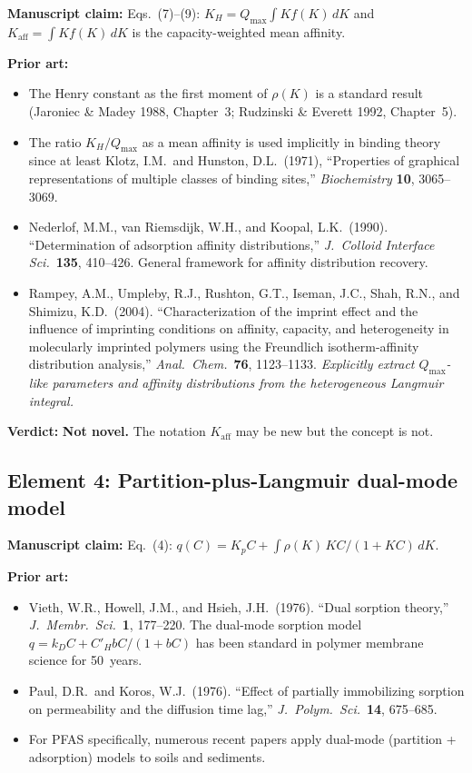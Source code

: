 \documentclass[12pt]{article}
\begin{document}
\textbf{Manuscript claim:} Eqs.~(7)--(9): $K_H=Q_{\max}\int K f(K)\,dK$
and $K_{\mathrm{aff}}=\int K f(K)\,dK$ is the capacity-weighted mean
affinity.

\textbf{Prior art:}
\begin{itemize}[nosep]
  \item The Henry constant as the first moment of $\rho(K)$ is a standard
        result (Jaroniec \& Madey 1988, Chapter~3; Rudzinski \& Everett
        1992, Chapter~5).
  \item The ratio $K_H/Q_{\max}$ as a mean affinity is used implicitly
        in binding theory since at least Klotz, I.M.\ and Hunston, D.L.\
        (1971), ``Properties of graphical representations of multiple
        classes of binding sites,'' \textit{Biochemistry} \textbf{10},
        3065--3069.
  \item Nederlof, M.M., van Riemsdijk, W.H., and Koopal, L.K.\ (1990).
        ``Determination of adsorption affinity distributions,''
        \textit{J.\ Colloid Interface Sci.}\ \textbf{135}, 410--426.
        General framework for affinity distribution recovery.
  \item Rampey, A.M., Umpleby, R.J., Rushton, G.T., Iseman, J.C.,
        Shah, R.N., and Shimizu, K.D.\ (2004).  ``Characterization of
        the imprint effect and the influence of imprinting conditions on
        affinity, capacity, and heterogeneity in molecularly imprinted
        polymers using the Freundlich isotherm-affinity distribution
        analysis,'' \textit{Anal.\ Chem.}\ \textbf{76}, 1123--1133.
        \emph{Explicitly extract $Q_{\max}$-like parameters and affinity
        distributions from the heterogeneous Langmuir integral.}
\end{itemize}

\textbf{Verdict:} \textbf{Not novel.}  The notation $K_{\mathrm{aff}}$ may
be new but the concept is not.

\subsection{Element 4: Partition-plus-Langmuir dual-mode model}

\textbf{Manuscript claim:} Eq.~(4): $q(C)=K_p C+\int\rho(K)\,KC/(1+KC)\,dK$.

\textbf{Prior art:}
\begin{itemize}[nosep]
  \item Vieth, W.R., Howell, J.M., and Hsieh, J.H.\ (1976). ``Dual
        sorption theory,'' \textit{J.\ Membr.\ Sci.}\ \textbf{1}, 177--220.
        The dual-mode sorption model $q=k_D C + C'_H bC/(1+bC)$ has been
        standard in polymer membrane science for 50~years.
  \item Paul, D.R.\ and Koros, W.J.\ (1976). ``Effect of partially
        immobilizing sorption on permeability and the diffusion time lag,''
        \textit{J.\ Polym.\ Sci.}\ \textbf{14}, 675--685.
  \item For PFAS specifically, numerous recent papers apply dual-mode
        (partition + adsorption) models to soils and sediments.
\end{itemize}
\end{document}
